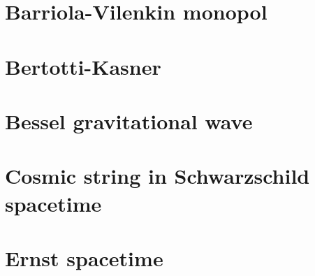 \documentclass[10pt,twoside,notitlepage,a4paper,fleqn,openbib]{report}
\begin{document}
\clearpage
\section{Barriola-Vilenkin monopol}
\setcounter{equation}{0}

\clearpage
\section{Bertotti-Kasner}
\setcounter{equation}{0}

\clearpage
\section{Bessel gravitational wave}
\setcounter{equation}{0}

\clearpage
\section{Cosmic string in Schwarzschild spacetime}
\setcounter{equation}{0}

\clearpage
\section{Ernst spacetime}
\setcounter{equation}{0}
\end{document}
